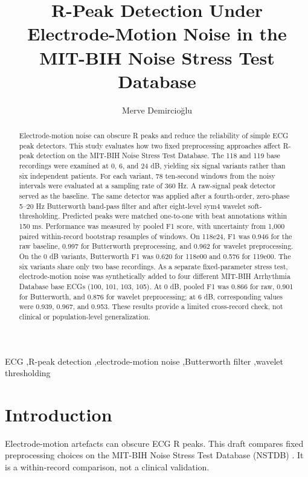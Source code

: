 \documentclass[preprint,12pt]{elsarticle}
\begin{document}
\begin{frontmatter}
\title{R-Peak Detection Under Electrode-Motion Noise in the MIT-BIH Noise Stress Test Database}
\author{Merve Demircio\u{g}lu}
\begin{abstract}
Electrode-motion noise can obscure R peaks and reduce the reliability of simple ECG peak detectors. This study evaluates how two fixed preprocessing approaches affect R-peak detection on the MIT-BIH Noise Stress Test Database. The 118 and 119 base recordings were examined at 0, 6, and 24 dB, yielding six signal variants rather than six independent patients. For each variant, 78 ten-second windows from the noisy intervals were evaluated at a sampling rate of 360 Hz. A raw-signal peak detector served as the baseline. The same detector was applied after a fourth-order, zero-phase 5--20 Hz Butterworth band-pass filter and after eight-level sym4 wavelet soft-thresholding. Predicted peaks were matched one-to-one with beat annotations within 150 ms. Performance was measured by pooled F1 score, with uncertainty from 1,000 paired within-record bootstrap resamples of windows. On 118e24, F1 was 0.946 for the raw baseline, 0.997 for Butterworth preprocessing, and 0.962 for wavelet preprocessing. On the 0 dB variants, Butterworth F1 was 0.620 for 118e00 and 0.576 for 119e00. The six variants share only two base recordings. As a separate fixed-parameter stress test, electrode-motion noise was synthetically added to four different MIT-BIH Arrhythmia Database base ECGs (100, 101, 103, 105). At 0 dB, pooled F1 was 0.866 for raw, 0.901 for Butterworth, and 0.876 for wavelet preprocessing; at 6 dB, corresponding values were 0.939, 0.967, and 0.953. These results provide a limited cross-record check, not clinical or population-level generalization.
\end{abstract}
\begin{keyword}
ECG \sep R-peak detection \sep electrode-motion noise \sep Butterworth filter \sep wavelet thresholding
\end{keyword}
\end{frontmatter}

\section{Introduction}
Electrode-motion artefacts can obscure ECG R peaks. This draft compares fixed preprocessing choices on the MIT-BIH Noise Stress Test Database (NSTDB) \cite{nstdb}. It is a within-record comparison, not a clinical validation.
\end{document}
